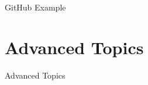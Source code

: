 \documentclass{beamer}
\begin{document}
\begin{frame}[plain]
 \vfill
 \begin{center}
  \LARGE \color{solarizedAccent} GitHub Example
 \end{center}
 \vfill
\end{frame}

\part{Advanced Topics}

\begin{frame}[plain]
 \vfill
 \begin{center}
  \LARGE \color{solarizedAccent} Advanced Topics
 \end{center}
 \vfill
\end{frame}
\end{document}
